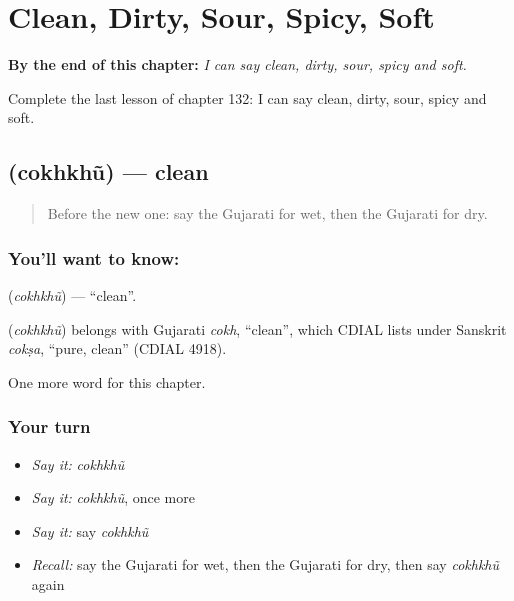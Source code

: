 
\chapter{Clean, Dirty, Sour, Spicy, Soft}
\label{ch:gu-clean-dirty-sour-spicy-soft}

\begin{chapteropening}
\textbf{By the end of this chapter:} \emph{I can say clean, dirty, sour, spicy and soft.}

Complete the last lesson of chapter 132: I can say clean, dirty, sour, spicy and soft.
\end{chapteropening}

\section[\texorpdfstring{\gu{ચોખ્ખું} (cokhkhũ)}{ચોખ્ખું (cokhkhũ)}]{ (cokhkhũ) — clean}

\label{lesson:GU-C132-cokhkhu}



\begin{quote}
Before the new one: say the Gujarati for wet, then the Gujarati for dry.
\end{quote}

\subsection*{You'll want to know: }
\textbf{} (\emph{cokhkhũ}) — \textquotedblleft{}clean\textquotedblright{}.

\begin{cousinweb}
\textbf{} (\emph{cokhkhũ}) belongs with Gujarati \emph{cokh}, \textquotedblleft{}clean\textquotedblright{}, which CDIAL lists under Sanskrit \emph{cokṣa}, \textquotedblleft{}pure, clean\textquotedblright{} (CDIAL 4918).
\end{cousinweb}

\begin{grammarlens}[title={What you've built}]
One more word for this chapter.
\end{grammarlens}

\subsection*{Your turn}
\begin{itemize}
\raggedright
  \item \emph{Say it:} \emph{cokhkhũ}
  \item \emph{Say it:} \emph{cokhkhũ}, once more
  \item \emph{Say it:} say \emph{cokhkhũ}
  \item \emph{Recall:} say the Gujarati for wet, then the Gujarati for dry, then say \emph{cokhkhũ} again
\end{itemize}

